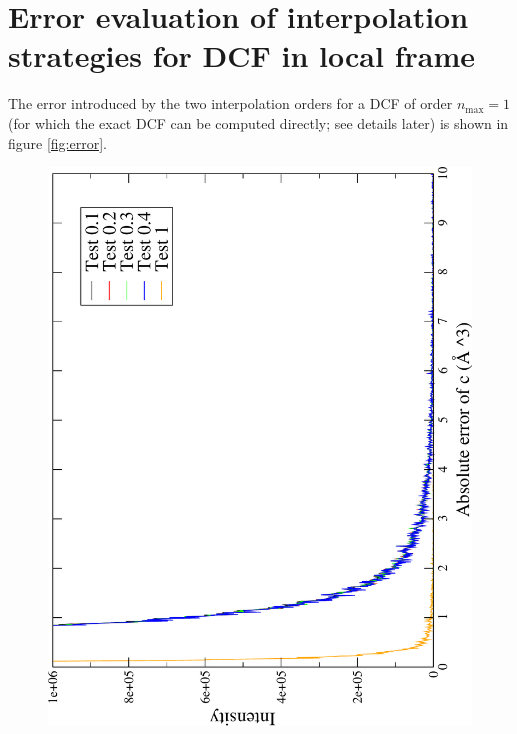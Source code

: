
\chapter{Error evaluation of interpolation strategies for DCF in local frame\label{chpt:error-evaluation-interpolation-DCF}}

The error introduced by the two interpolation orders for a \acs{DCF}
of order $n_{\mathrm{max}}=1$ (for which the exact \acs{DCF} can
be computed directly; see details later) is shown in figure \ref{fig:error}.\vspace{8ex}

\begin{figure}[h]
\centering{}%
\noindent\begin{minipage}[t]{1\textwidth}%
\begin{center}
\includegraphics[angle=-90,scale=0.35]{_figure/c_local_to_global_coordinates_32_96/absolute_error}
\par\end{center}

\end{minipage}
\end{figure}
